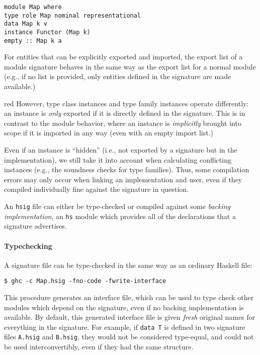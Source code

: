 \documentclass{article}
\begin{document}
\begin{verbatim}
module Map where
type role Map nominal representational
data Map k v
instance Functor (Map k)
empty :: Map k a
\end{verbatim}

For entities that can be explicitly exported and imported, the
export list of a module signature behaves in the same way as
the export list for a normal module (e.g., if no list is provided,
only entities defined in the signature are made available.)

\begin{color}{red}
However, type class instances and type family instances operate
differently: an instance is \emph{only} exported if it is directly
defined in the signature.  This is in contrast to the module behavior,
where an instance is \emph{implicitly} brought into scope if it is
imported in any way (even with an empty import list.)

Even if an instance is ``hidden'' (i.e., not exported by a signature
but in the implementation), we still take it into account when calculating
conflicting instances (e.g., the soundness checks for type families).  Thus,
some compilation errors may only occur when linking an implementation
and user, even if they compiled individually fine against the signature
in question.
\end{color}

An \texttt{hsig} file can either be type-checked or compiled against some
\emph{backing implementation}, an \texttt{hs} module which provides all
of the declarations that a signature advertises.

\paragraph{Typechecking} A signature file can be type-checked in the same
way as an ordinary Haskell file:

\begin{verbatim}
$ ghc -c Map.hsig -fno-code -fwrite-interface
\end{verbatim}

This procedure generates an interface file, which can be used to type
check other modules which depend on the signature, even if no backing
implementation is available.  By default, this generated interface file
is given \emph{fresh} original names for everything in the signature.
For example, if \texttt{data T} is defined in two signature files
\texttt{A.hsig} and \texttt{B.hsig}, they would not be considered
type-equal, and could not be used interconvertibly, even if they
had the same structure.
\end{document}
